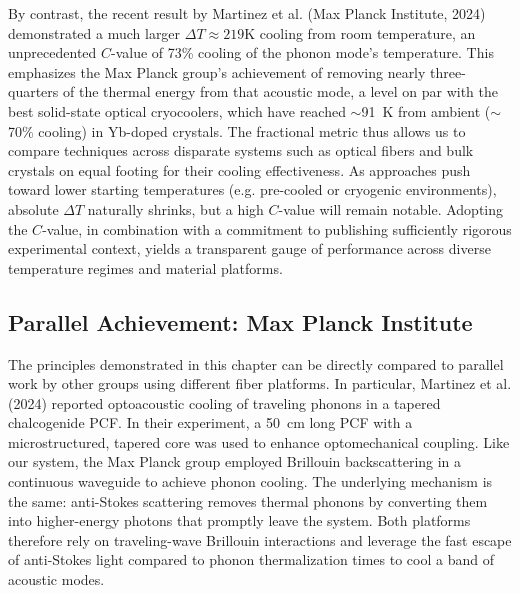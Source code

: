 By contrast, the recent result by Martinez et al. (Max Planck Institute, 2024) \cite{blazquez2024optoacoustic} demonstrated a much larger \(\Delta T \approx 219\text{K}\) cooling from room temperature, an unprecedented \(C\)-value of 73\% cooling of the phonon mode’s temperature. This emphasizes the Max Planck group’s achievement of removing nearly three-quarters of the thermal energy from that acoustic mode, a level on par with the best solid-state optical cryocoolers, which have reached \(\sim\)\SI{91}{\kelvin} from ambient (\(\sim\)70\% cooling) in Yb-doped crystals. \cite{zhang2024experimental} The fractional metric thus allows us to compare techniques across disparate systems such as optical fibers and bulk crystals on equal footing for their cooling effectiveness. As approaches push toward lower starting temperatures (e.g. pre-cooled or cryogenic environments), absolute \(\Delta T\) naturally shrinks, but a high \(C\)-value will remain notable. Adopting the \(C\)-value, in combination with a commitment to publishing sufficiently rigorous experimental context, \cite{zhang2024experimental} yields a transparent gauge of performance across diverse temperature regimes and material platforms.

\subsection{Parallel Achievement: Max Planck Institute}
\label{Cooling:subsec:Parallel Achievement}

The principles demonstrated in this chapter can be directly compared to parallel work by other groups using different fiber platforms. In particular, Martinez et al. (2024) \cite{blazquez2024optoacoustic} reported optoacoustic cooling of traveling phonons in a tapered chalcogenide \ac{PCF}. In their experiment, a \SI{50}{\centi\meter} long PCF with a microstructured, tapered core was used to enhance optomechanical coupling. Like our system, the Max Planck group employed Brillouin backscattering in a continuous waveguide to achieve phonon cooling. The underlying mechanism is the same: anti-Stokes scattering removes thermal phonons by converting them into higher-energy photons that promptly leave the system. Both platforms therefore rely on traveling-wave Brillouin interactions and leverage the fast escape of anti-Stokes light compared to phonon thermalization times to cool a band of acoustic modes.

